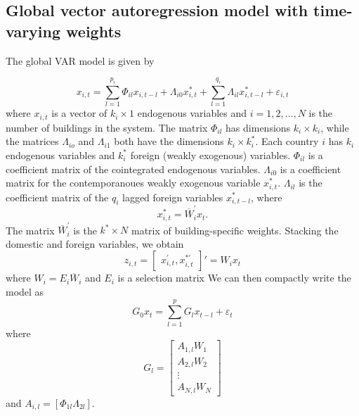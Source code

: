 \documentclass[preprint, 11pt]{elsarticle}
\newcommand{\?}{\stackrel{?}{=}}
\newcommand{\ol}{\overline}
\begin{document}
\subsection{Global vector autoregression model with time-varying weights}
The global VAR model \cite{dees2007exploring} is given by

\begin{equation}
  \label{eq:1}
  x_{i,t} = \sum_{l=1}^{p_{i}}\Phi_{il}x_{i,t-l} + \Lambda_{i0}x_{i,t}^{*} + \sum_{l=1}^{q_{i}}\Lambda_{il}x_{i,t-l}^{*} + \varepsilon_{i,t}
\end{equation}
where $x_{i,t}$ is a vector of $k_{i}\times 1$ endogenous variables and $i = 1, 2, \ldots, N$ is the number of buildings
in the system.  The matrix $\Phi_{il}$ has dimensions $k_{i}\times k_{i}$, while the matrices $\Lambda_{io}$ and
$\Lambda_{i1}$ both have the dimensions $k_{i}\times k_{i}^{*}$.
Each country $i$ has $k_{i}$ endogenous variables and $k_{i}^{*}$ foreign (weakly exogenous) variables.
$\Phi_{il}$ is a coefficient matrix of the cointegrated
endogenous variables. $\Lambda_{i0}$ is a coefficient matrix for the contemporanoues weakly exogenous variable
$x_{i,t}^{*}$. $\Lambda_{il}$ is the coefficient matrix of the $q_{i}$ lagged foreign variables $x_{i,t-l}^{*}$, where
\begin{equation}
  \label{eq:2}
  x_{i,t}^{*} = \ol{W}_{i}^{'}x_{t}.
\end{equation}
The matrix $\ol{W}_{i}^{'}$ is the $k^{*} \times N$ matrix of building-specific weights.
Stacking the domestic and foreign variables, we obtain
\begin{equation}
  \label{eq:3}
  z_{i,t} =
  \begin{bmatrix}
    x_{i,t}^{'}, x_{i,t}^{*'}
  \end{bmatrix}'  = W_{i}x_{t}
\end{equation}
where $W_{i} = E_{i}\ol{W}_{i}$ and $E_{i}$ is a selection matrix We
can then compactly write the model as
\begin{equation}
  \label{eq:4}
  G_{0}x_{t} = \sum_{l=1}^{p}G_{l}x_{t-l} + \varepsilon_{t}
\end{equation}
where
\begin{equation}
  \label{eq:5}
  G_{l} =
  \begin{bmatrix}
    A_{1,l}W_{1}\\ A_{2,l}W_{2}\\ \vdots \\A_{N,l}W_{N}
  \end{bmatrix}
\end{equation}
and $A_{i,l} = [\Phi_{1l}  \Lambda_{2l}]$.
\end{document}
